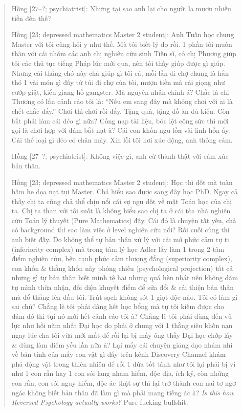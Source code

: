 \documentclass[12pt]{article}
\begin{document}
\begin{quote}
	{\sf Hồng [27--?; psychiatrist]}: Nhưng tại sao anh lại cho người lạ mượn nhiều tiền đến thế?
	
	{\sf Hồng [23; depressed mathematics Master 2 student]}: Anh Tuấn học chung Master với tôi cũng hỏi y như thế. Mà tôi biết lý do rồi. 1 phần tôi muốn thân với cái nhóm các anh chị nghiên cứu sinh Tiến sĩ, có chị Phương giúp tôi các thủ tục tiếng Pháp lúc mới qua, nên tôi thấy giúp được gì giúp. Nhưng cái thằng chó này chả giúp gì tôi cả, mỗi lần đi chợ chung là hắn thó 1 vài món gì đấy từ túi đi chợ của tôi, mượn tiền mà cái giọng như cướp giật, kiểu giang hồ gangster. Mà nguyên nhân chính á? Chắc là chị Thương có lần cảnh cáo tôi là: ``Nếu em sang đây mà không chơi với ai là chết chắc đấy.'' Chơi thì chơi rồi đấy. Tặng quà, tặng đồ ăn đủ kiểu. Còn bắt phải làm cái đéo gì nữa? Cống nạp tài liệu, bóc lột công sức thì mới gọi là chơi hợp với đám bắt nạt à? Cái con khốn ngu \st{lồn} vãi linh hồn ấy. Cái thể loại gì đéo có chân mày. Xin lỗi tôi hơi xúc động, anh thông cảm.
	
	{\sf Hồng [27--?; psychiatrist]}: Không việc gì, anh cứ thành thật với cảm xúc bản thân.
	
	{\sf Hồng [23; depressed mathematics Master 2 student]}: Học thì dốt mà toàn hăm he dọa nạt tụi Master. Chả hiểu sao được sang đây học PhD. Ngay cả thầy chị ta cũng chả thể chịu nổi cái sự ngu dốt về mặt Toán học của chị ta. Chị ta than với tôi suốt là không hiểu sao chị ta ở cái tòa nhà nghiên cứu Toán lý thuyết (Pure Mathematics) đấy. Cái đó là chuyện tất yếu, chả có background thì sao làm việc ở level nghiên cứu nổi? Rồi cuối cùng thì anh biết đấy. Do không thể tự bản thân xử lý với cái mớ phức cảm tự ti (inferiority complex) mà trong tâm lý học Adler lấy làm 1 trong 2 tâm điểm nghiên cứu, bên cạnh phức cảm thượng đẳng (superiority complex), con khốn \& thằng khốn này phóng chiếu (psychological projection) tất cả những gì tự bản thân biết mình tệ hại nhưng quá hèn nhát nên không dám tự mình thừa nhận, đối diện khuyết điểm để sửa đổi \& cải thiện bản thân mà đổ thẳng lên đầu tôi. Trút sạch không sót 1 giọt độc nào. Tôi có làm gì sai chứ? Chẳng lẽ tôi phải dâng hết học bổng mà tự tôi kiếm được cho đám đó thì tụi nó mới hết cảnh cáo tôi à? Chẳng lẽ tôi phải dùng đến vũ lực như hồi năm nhất Đại học do phải ở chung với 1 thằng siêu khốn nạn ngay lúc cha tôi vừa mới mất để rồi lại bị mấy ông thầy Đại học chớp lấy \& dùng làm điểm yếu lần nữa à? Lại mấy cái chuyện giảng đạo nhảm nhí về bản tính của mấy con vật gì đấy trên kênh Discovery Channel khám phá động vật trong thiên nhiên để rồi 1 đứa tốt tánh như tôi lại phải bị ví như 1 con rắn hay 1 con sói lang nham hiểm, độc địa, ích kỷ, còn những con rắn, con sói nguy hiểm, độc ác thật sự thì lại trở thành con nai tơ ngơ ngác không biết bản thân đã làm gì mà phải mang tiếng ác à? {\it Is this how Reversed Psychology actually works?} Pure fucking bullshit.
	

\end{quote}
\end{document}
